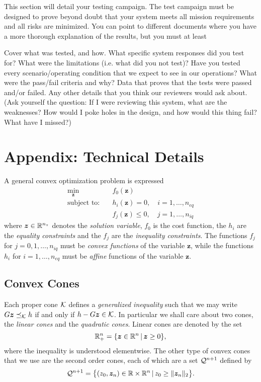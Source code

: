 \documentclass[12pt]{article}
\begin{document}
This section will detail your testing campaign. The test campaign must be designed to prove beyond doubt that your system meets all mission requirements and all risks are minimized. You can point to different documents where you have a more thorough explanation of the results, but you must at least

Cover what was tested, and how. What specific system responses did you test for? What were the limitations (i.e. what did you not test)? Have you tested every scenario/operating condition that we expect to see in our operations?  What were the pass/fail criteria and why?
Data that proves that the tests were passed and/or failed. 
Any other details that you think our reviewers would ask about. (Ask yourself the question: If I were reviewing this system, what are the weaknesses? How would I poke holes in the design, and how would this thing fail? What have I missed?)


\clearpage
\section*{Appendix: Technical Details}

A general convex optimization problem is expressed
\begin{subequations}
\begin{align}
\min_{\bm{z}} &\quad f_0(\bm{z}) \\
\text{subject to:} &\quad h_i(\bm{z}) = 0, \quad i=1,\ldots,n_{eq} \\
&\quad f_j(\bm{z}) \leq 0, \quad j = 1,\ldots,n_{iq}
\end{align}
\end{subequations}
where $\bm{z}\in{\mathbb{R}}^{n_z}$ denotes the \textit{solution variable}, $f_0$ is the cost function, the $h_i$ are the \textit{equality constraints} and the $f_j$ are the \textit{inequality constraints}. The functions $f_j$ for $j=0,1,\ldots,n_{iq}$ must be \textit{convex functions} of the variable $\bm{z}$, while the functions $h_i$ for $i=1,\ldots,n_{eq}$ must be \textit{affine} functions of the variable $\bm{z}$.

\subsection{Convex Cones}

Each proper cone $\mathcal{K}$ defines a \textit{generalized inequality} such that we may write $G \bm{z} \preceq_{\mathcal{K}} h$ if and only if $h - G \bm{z} \in \mathcal{K}$. In particular we shall care about two cones, the \textit{linear cones} and the \textit{quadratic cones}. Linear cones are denoted by the set 
\begin{equation}
{\mathbb{R}}_+^{n} = \{ \bm{z}\in{\mathbb{R}}^n \,|\, \bm{z} \geq 0 \},
\label{eq:lcone_set}
\end{equation}
where the inequality is understood elementwise. The other type of convex cones that we use are the second order cones, each of which are a set $\mathcal{Q}^{n+1}$ defined by
\begin{equation}
\mathcal{Q}^{n+1} = \big\{ (z_0,\bm{z}_n)\in{\mathbb{R}}\times{\mathbb{R}}^n \,|\, z_0 \geq \| \bm{z}_n \|_2 \big\}.
\label{eq:soc_set}
\end{equation}
\end{document}
